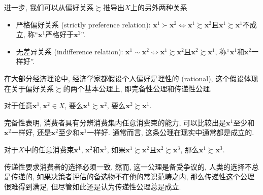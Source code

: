 \documentclass[cn, 12pt, math=mtpro2, bibstyle=apa, blue, twocol]{elegantbook}
\newcommand{\x}{\mathbf{x}}
\begin{document}
进一步, 我们可以从偏好关系$\succsim$推导出$X$上的另外两种关系
\begin{itemize}
  \item 严格偏好关系 (strictly preference relation): $\x^1\succ \x^2 \Leftrightarrow \x^1\succsim \x^2$且$ \x^1\succsim \x^1$不成立, 称“$\x^1$严格好于$\x^2$”.
  \item 无差异关系 (indifference relation): $\x^1\sim \x^2 \Leftrightarrow \x^1\succsim \x^2$且$\x^2\succsim \x^1$, 称“$\x^1$和$\x^2$一样好”.
\end{itemize}
在大部分经济理论中, 经济学家都假设个人偏好是理性的 (rational), 这个假设体现在关于偏好关系$\succsim$的两个基本公理上, 即完备性公理和传递性公理.

\begin{axiom}[完备性]\label{axi:axi1.1}
对于任意$\x^1, \x^2\in X$, 要么$\x^1\succsim \x^2$, 要么$\x^2\succsim \x^1$.
\end{axiom}
完备性表明, 消费者具有分辨消费集内任意消费束的能力, 可以比较出是$\x^1$至少和$\x^2$一样好, 还是$\x^2$至少和$\x^1$一样好. 通常而言, 这条公理在现实中通常都是成立的.

\begin{axiom}[传递性]\label{axi:axi1.2}
对于$X$中的任意消费束$\x^1$, $\x^2$和$\x^3$, 如果$\x^1\succsim \x^2$且$\x^2\succsim\x^3$, 那么$\x^1\succsim\x^3$.
\end{axiom}
传递性要求消费者的选择必须一致. 然而, 这一公理是备受争议的, 人类的选择不总是传递的, 如果决策者评估的备选物不在他的常识范畴之内, 那么传递性这个公理很难得到满足, 但尽管如此还是认为传递性公理总是成立.
\end{document}
